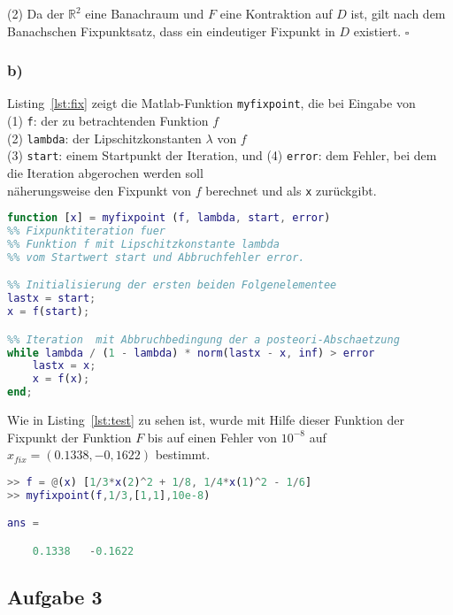 \documentclass[11pt,a4paper,ngerman]{article}
\begin{document}
(2) Da der $\mathbb{R}^2$ eine Banachraum und $F$ eine Kontraktion auf $D$ ist, gilt nach dem Banachschen Fixpunktsatz, dass ein eindeutiger Fixpunkt in $D$ existiert. 
\mbox{} \hfill $\square$

\subsubsection*{b)}
Listing~\ref{lst:fix} zeigt die Matlab-Funktion \texttt{myfixpoint}, die bei Eingabe von \\
(1) \texttt{f}: der zu betrachtenden Funktion $f$\\
(2) \texttt{lambda}: der Lipschitzkonstanten $\lambda$ von $f$ \\
(3) \texttt{start}: einem Startpunkt der Iteration, und
(4) \texttt{error}: dem Fehler, bei dem die Iteration abgerochen werden soll \\
näherungsweise den Fixpunkt von $f$ berechnet und als \texttt{x} zurückgibt.

\begin{lstlisting}[language=matlab,caption=Funktion zur näherungsweisen Bestimmung eines Fixpunkts, label=lst:fix]
function [x] = myfixpoint (f, lambda, start, error)
%% Fixpunktiteration fuer
%% Funktion f mit Lipschitzkonstante lambda
%% vom Startwert start und Abbruchfehler error.

%% Initialisierung der ersten beiden Folgenelementee
lastx = start;
x = f(start);

%% Iteration  mit Abbruchbedingung der a posteori-Abschaetzung
while lambda / (1 - lambda) * norm(lastx - x, inf) > error
    lastx = x;
    x = f(x);
end;
\end{lstlisting}

Wie in Listing~\ref{lst:test} zu sehen ist, wurde mit Hilfe dieser Funktion der Fixpunkt der Funktion $F$ bis auf einen Fehler von $10^{-8}$ auf $x_{fix} = (0.1338,-0,1622)$ bestimmt.

\begin{lstlisting}[language=matlab,label=lst:test,caption=Testaufruf der Funktion myfixpoint]
>> f = @(x) [1/3*x(2)^2 + 1/8, 1/4*x(1)^2 - 1/6]
>> myfixpoint(f,1/3,[1,1],10e-8)

ans =

    0.1338   -0.1622
\end{lstlisting}

\subsection*{Aufgabe 3}
\end{document}
